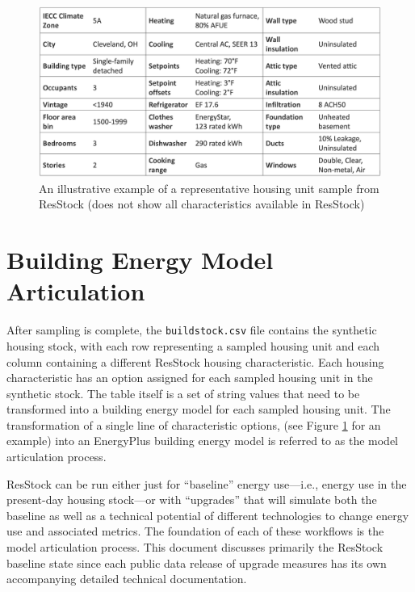 \begin{figure}
    \centering
    \includegraphics[width=1\linewidth]{images/illustrative_sample.png}
    \caption{An illustrative example of a representative housing unit sample from ResStock (does not show all characteristics available in ResStock)}
    \label{fig:illustrative_sample}
\end{figure}

\section{Building Energy Model Articulation} \label{sec:bem_articulation}
After sampling is complete, the \texttt{buildstock.csv} file contains the synthetic housing stock, with each row representing a sampled housing unit and each column containing a different ResStock housing characteristic. Each housing characteristic has an option assigned for each sampled housing unit in the synthetic stock. The table itself is a set of string values that need to be transformed into a building energy model for each sampled housing unit. The transformation of a single line of characteristic options, (see Figure \ref{fig:illustrative_sample} for an example) into an EnergyPlus building energy model is referred to as the model articulation process.

ResStock can be run either just for ``baseline'' energy use---i.e., energy use in the present-day housing stock---or with ``upgrades'' that will simulate both the baseline as well as a technical potential of different technologies to change energy use and associated metrics. The foundation of each of these workflows is the model articulation process. This document discusses primarily the ResStock baseline state since each public data release of upgrade measures has its own accompanying detailed technical documentation. 

